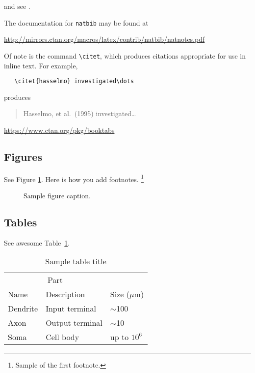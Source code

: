 \documentclass{article}
\theoremstyle{plain}%
\theoremstyle{definition}
\theoremstyle{remark}
\begin{document}
\cite{kour2014real,kour2014fast} and see \cite{hadash2018estimate}.

The documentation for \verb+natbib+ may be found at
\begin{center}
  \url{http://mirrors.ctan.org/macros/latex/contrib/natbib/natnotes.pdf}
\end{center}
Of note is the command \verb+\citet+, which produces citations
appropriate for use in inline text.  For example,
\begin{verbatim}
   \citet{hasselmo} investigated\dots
\end{verbatim}
produces
\begin{quote}
  Hasselmo, et al.\ (1995) investigated\dots
\end{quote}

\begin{center}
  \url{https://www.ctan.org/pkg/booktabs}
\end{center}


\subsection{Figures}
See Figure \ref{fig:fig1}. Here is how you add footnotes. \footnote{Sample of the first footnote.}

\begin{figure}
  \centering
  \fbox{\rule[-.5cm]{4cm}{4cm} \rule[-.5cm]{4cm}{0cm}}
  \caption{Sample figure caption.}
  \label{fig:fig1}
\end{figure}

\subsection{Tables}
See awesome Table~\ref{tab:table}.

\begin{table}
 \caption{Sample table title}
  \centering
  \begin{tabular}{lll}
    \toprule
    \multicolumn{2}{c}{Part}                   \\
    \cmidrule(r){1-2}
    Name     & Description     & Size ($\mu$m) \\
    \midrule
    Dendrite & Input terminal  & $\sim$100     \\
    Axon     & Output terminal & $\sim$10      \\
    Soma     & Cell body       & up to $10^6$  \\
    \bottomrule
  \end{tabular}
  \label{tab:table}
\end{table}
\end{document}
